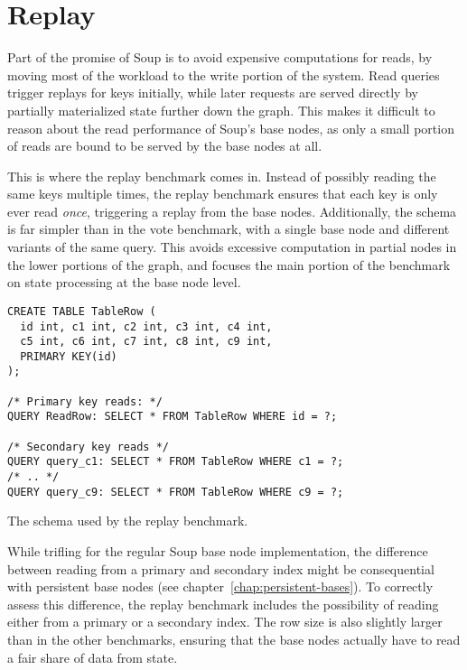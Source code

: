 \section{Replay}\label{sec:bench-replay}

Part of the promise of Soup is to avoid expensive computations for reads, by
moving most of the workload to the write portion of the system. Read queries
trigger replays for keys initially, while later requests are served directly by
partially materialized state further down the graph. This makes it difficult to
reason about the read performance of Soup's base nodes, as only a small portion
of reads are bound to be served by the base nodes at all.

This is where the replay benchmark comes in. Instead of possibly reading the
same keys multiple times, the replay benchmark ensures that each key is only
ever read \textit{once}, triggering a replay from the base nodes. Additionally,
the schema is far simpler than in the vote benchmark, with a single base node
and different variants of the same query. This avoids excessive computation in
partial nodes in the lower portions of the graph, and focuses the main portion
of the benchmark on state processing at the base node level.

\begin{listing}[H]
  \begin{verbatim}
CREATE TABLE TableRow (
  id int, c1 int, c2 int, c3 int, c4 int,
  c5 int, c6 int, c7 int, c8 int, c9 int,
  PRIMARY KEY(id)
);

/* Primary key reads: */
QUERY ReadRow: SELECT * FROM TableRow WHERE id = ?;

/* Secondary key reads */
QUERY query_c1: SELECT * FROM TableRow WHERE c1 = ?;
/* .. */
QUERY query_c9: SELECT * FROM TableRow WHERE c9 = ?;
  \end{verbatim}

  \caption{The schema used by the replay benchmark.}\label{lst:replay}
\end{listing}

While trifling for the regular Soup base node implementation, the difference
between reading from a primary and secondary index might be consequential with
persistent base nodes (see chapter~\ref{chap:persistent-bases}). To correctly
assess this difference, the replay benchmark includes the possibility of reading
either from a primary or a secondary index. The row size is also slightly larger
than in the other benchmarks, ensuring that the base nodes actually have to read
a fair share of data from state.

